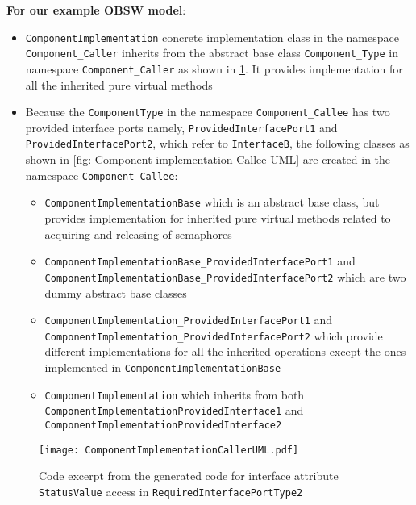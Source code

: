 \textbf{For our example OBSW model}:
\begin{itemize}
\item \texttt{Component\allowbreak Implementation} concrete implementation class in the namespace \texttt{Component\_Caller} inherits from the abstract base class \texttt{Component\_Type} in namespace \texttt{Component\allowbreak\_Caller} as shown in \cref{fig: Component implementation Caller UML}. It provides implementation for all the inherited pure virtual methods
\item Because the \texttt{ComponentType} in the namespace \texttt{Component\_Callee} has two provided interface ports namely, \texttt{Provided\allowbreak Interface\allowbreak Port1} and \texttt{Provided\allowbreak Interface\allowbreak Port2}, which refer to \texttt{InterfaceB}, the following classes as shown in \cref{fig: Component implementation Callee UML} are created in the namespace \texttt{Component\_Callee}:
\begin{itemize}
\item \texttt{ComponentImplementation\allowbreak Base} which is an abstract base class, but provides implementation for inherited pure virtual methods related to acquiring and releasing of semaphores
\item \texttt{Component\allowbreak Implementation\allowbreak Base\_\allowbreak Provided\allowbreak Interface\allowbreak Port1\allowbreak} and \texttt{Component\allowbreak Implementation\allowbreak Base\_\allowbreak Provided\allowbreak Interface\allowbreak Port2\allowbreak} which are two dummy abstract base classes
\item \texttt{Component\allowbreak Implementation\_\allowbreak Provided\allowbreak Interface\allowbreak Port1} and \texttt{Component\allowbreak Impl\allowbreak emen\allowbreak tation\_\allowbreak Provided\allowbreak Interface\allowbreak Port2} which provide different implementations for all the inherited operations except the ones implemented in \texttt{Component\allowbreak Implementation\allowbreak Base}
\item \texttt{Component\allowbreak Implementation} which inherits from both \texttt{Component\allowbreak Implemen\allowbreak tation\allowbreak Provided\allowbreak Interface1} and \texttt{Component\allowbreak Implementation\allowbreak Provided\allowbreak Inter\allowbreak face2}
\end{itemize}   
\end{itemize}

\begin{figure}[h]
	\centering
	\texttt{[image: ComponentImplementationCallerUML.pdf]}
	\caption{Code excerpt from the generated code for interface attribute \texttt{StatusValue} access in \texttt{Required\allowbreak InterfacePort\allowbreak Type2}}
	\label{fig: Component implementation Caller UML}
\end{figure} 

